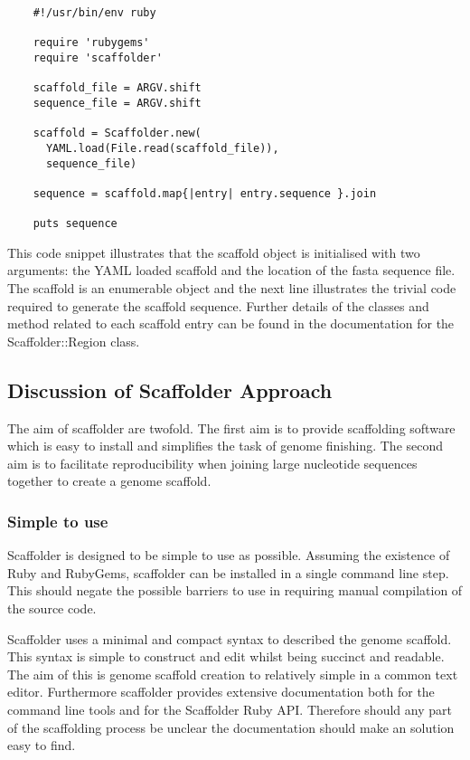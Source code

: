 \documentclass[10pt]{bmc_article}
\newenvironment{bmcformat}{\begin{raggedright}\baselineskip20pt\sloppy\setboolean{publ}{false}}{\end{raggedright}\baselineskip20pt\sloppy}
\begin{document}
\begin{bmcformat}
  \begin{verbatim}
    #!/usr/bin/env ruby

    require 'rubygems'
    require 'scaffolder'

    scaffold_file = ARGV.shift
    sequence_file = ARGV.shift

    scaffold = Scaffolder.new(
      YAML.load(File.read(scaffold_file)),
      sequence_file)

    sequence = scaffold.map{|entry| entry.sequence }.join

    puts sequence
  \end{verbatim}

This code snippet illustrates that the scaffold object is initialised with two
arguments: the YAML loaded scaffold and the location of the fasta sequence
file. The scaffold is an enumerable object and the next line illustrates the
trivial code required to generate the scaffold sequence. Further details of the
classes and method related to each scaffold entry can be found in the
documentation for the Scaffolder::Region class. \pb

\subsection*{Discussion of Scaffolder Approach} %

The aim of scaffolder are twofold. The first aim is to provide scaffolding
software which is easy to install and simplifies the task of genome finishing.
The second aim is to facilitate reproducibility when joining large nucleotide
sequences together to create a genome scaffold. \pb

\subsubsection*{Simple to use} %

Scaffolder is designed to be simple to use as possible. Assuming the existence
of Ruby and RubyGems, scaffolder can be installed in a single command line
step. This should negate the possible barriers to use in requiring manual
compilation of the source code. \pb

Scaffolder uses a minimal and compact syntax to described the genome scaffold.
This syntax is simple to construct and edit whilst being succinct and readable.
The aim of this is genome scaffold creation to relatively simple in a common
text editor. Furthermore scaffolder provides extensive documentation both for
the command line tools and for the Scaffolder Ruby API. Therefore should any
part of the scaffolding process be unclear the documentation should make an
solution easy to find. \pb


\end{bmcformat}
\end{document}
